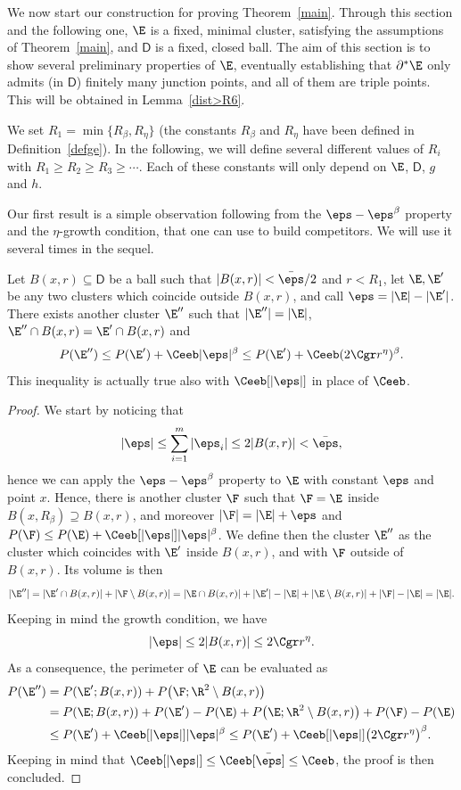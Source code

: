 We now start our construction for proving Theorem~\ref{main}. Through this section and the following one, $\E$ is a fixed, minimal cluster, satisfying the assumptions of Theorem~\ref{main}, and $\mathsf{D}$ is a fixed, closed ball. The aim of this section is to show several preliminary properties of $\E$, eventually establishing that $\partial^* \E$ only admits (in $\mathsf{D}$) finitely many junction points, and all of them are triple points. This will be obtained in Lemma~\ref{dist>R6}.

We set $R_1=\min\{R_\beta,R_\eta\}$ (the constants $R_\beta$ and $R_\eta$ have been defined in Definition~\ref{defge}). In the following, we will define several different values of $R_i$ with $R_1\geq R_2\geq R_3\geq \cdots$. Each of these constants will only depend on $\E$, $\mathsf{D}$, $g$ and $h$.

Our first result is a simple observation following from the $\eps-\eps^\beta$ property and the $\eta$-growth condition, that one can use to build competitors. We will use it several times in the sequel.

\begin{lem}\label{labello}
Let $B(x,r)\subseteq \mathsf{D}$ be a ball such that $|B(x,r)|<\bar\eps/2$ and $r<R_1$, let $\E, \E'$ be any two clusters which coincide outside $B(x,r)$, and call $\eps=|\E|-|\E'|$. There exists another cluster $\E''$ such that $|\E''|=|\E|$, $\E''\cap B(x,r)=\E'\cap B(x,r)$ and
\begin{equation}\label{proplab}
P(\E'')\leq P(\E') + \Ceeb |\eps|^\beta \leq P(\E') + \Ceeb (2\Cgr r^\eta)^\beta .
\end{equation}
This inequality is actually true also with $\Ceeb[|\eps|]$ in place of $\Ceeb$.
\end{lem}
\begin{proof}
We start by noticing that
\[
|\eps| \leq \sum_{i=1}^m |\eps_i| \leq 2 |B(x,r)| < \bar\eps,
\]
hence we can apply the $\eps-\eps^\beta$ property to $\E$ with constant $\eps$ and point $x$. Hence, there is another cluster $\F$ such that $\F=\E$ inside $B(x,R_\beta)\supseteq B(x,r)$, and moreover $|\F|=|\E|+\eps$ and $P(\F)\leq P(\E) + \Ceeb[|\eps|] |\eps|^\beta$. We define then the cluster $\E''$ as the cluster which coincides with $\E'$ inside $B(x,r)$, and with $\F$ outside of $B(x,r)$. Its volume is then
\[
|\E''| = |\E' \cap B(x,r)| + |\F\setminus B(x,r)|
= |\E\cap B(x,r)| + |\E'| - |\E| + |\E\setminus B(x,r)| + |\F| - |\E|
=|\E|.
\]
Keeping in mind the growth condition, we have
\[
|\eps| \leq 2 |B(x,r)| \leq 2 \Cgr r^\eta.
\]
As a consequence, the perimeter of $\E$ can be evaluated as
\[\begin{split}
P(\E'') &= P(\E'; B(x,r)) + P\big(\F;\R^2\setminus B(x,r)\big)\\
&= P(\E; B(x,r)) +P(\E')-P(\E) + P\big(\E;\R^2\setminus B(x,r)\big) + P(\F)-P(\E)\\
&\leq P(\E') + \Ceeb[|\eps|] |\eps|^\beta
\leq P(\E') + \Ceeb[|\eps|] \big(2\Cgr r^\eta\big)^\beta.
\end{split}\]
Keeping in mind that $\Ceeb[|\eps|]\leq \Ceeb[\bar\eps]\leq\Ceeb$, the proof is then concluded.
\end{proof}

